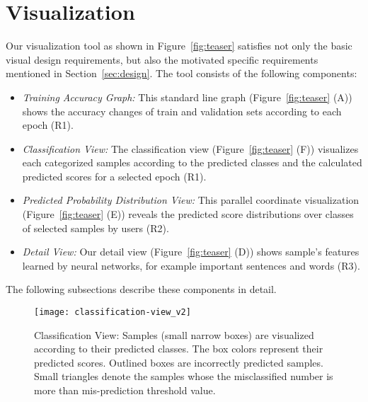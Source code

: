 
\section{Visualization}
\label{sec:visualization}

Our visualization tool as shown in Figure~\ref{fig:teaser} satisfies not only the basic visual design requirements, but also the motivated specific requirements mentioned in Section~\ref{sec:design}.
The tool consists of the following components:
\begin{itemize}
\item \textit{Training Accuracy Graph:} This standard line graph (Figure~\ref{fig:teaser} (A)) shows the accuracy changes of train and validation sets according to each epoch (R1).
\item \textit{Classification View:} The classification view (Figure~\ref{fig:teaser} (F)) visualizes each categorized samples according to the predicted classes and the calculated predicted scores for a selected epoch (R1).
\item \textit{Predicted Probability Distribution View:} This parallel coordinate visualization (Figure~\ref{fig:teaser} (E)) reveals the predicted score distributions over classes of selected samples by users (R2).
\item \textit{Detail View:} Our detail view  (Figure~\ref{fig:teaser} (D)) shows sample's features learned by neural networks, for example important sentences and words (R3).
\end{itemize}
The following subsections describe these components in detail.

\begin{figure}[tb]
\centering
\texttt{[image: classification-view\_v2]}
\caption{Classification View: Samples (small narrow boxes) are visualized according to their predicted classes. The box colors represent their predicted scores. Outlined boxes are incorrectly predicted samples.
Small triangles denote the samples whose the misclassified number is more than mis-prediction threshold value.}
\label{fig:classification-view}
\end{figure}

